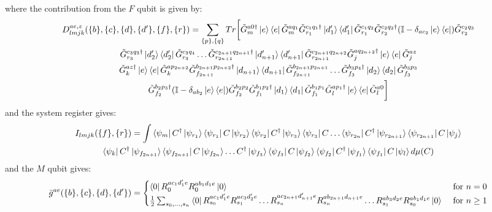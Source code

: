 \documentclass[aps,floatfix,10pt,amssymb,amsfont,amsmath,superscriptaddress,float,nofootinbib,longbibliography,nobalancelastpage,twocolumn]{revtex4-2}
\begin{document}
where the contribution from the $F$ qubit is given by:
\begin{multline}
    D^{ae,z}_{lmjk}(\{b\},\{c\},\{d\},\{d'\},\{f\},\{r\}) = 
    \sum_{\{p\},\{q\}}
Tr\bigg[\tilde G^{a0\dagger}_m\ket{e}\bra{e}\tilde G^{aq_1}_m\tilde G^{c_1q_1\dagger}_{r_1}\ket{d'_1}\bra{d'_1}\tilde G^{c_1q_2}_{r_1}\tilde G^{c_2q_2\dagger}_{r_2}(\mathbb{I} - \delta_{ac_2}\ket{e}\bra{e})\tilde G^{c_2q_3}_{r_2}\\\tilde G^{c_3q_3\dagger}_{r_3}\ket{d'_2}\bra{d'_2}\tilde G^{c_3q_4}_{r_3}\ldots
\tilde G^{c_{2n+1}q_{2n+1}\dagger}_{r_{2n+1}}\ket{d'_{n+1}}\bra{d'_{n+1}}\tilde G^{c_{2n+1}q_{2n+2}}_{r_{2n+1}}\tilde G^{aq_{2n+2}\dagger}_j\ket{e}\bra{e}\tilde G^{az}_j\\ \tilde G^{az\dagger}_k\ket{e}\bra{e}\tilde G^{ap_{2n+2}}_k\tilde G^{b_{2n+1}p_{2n+2}\dagger}_{f_{2n+1}}\ket{d_{n+1}}\bra{d_{n+1}}\tilde G^{b_{2n+1}p_{2n+1}}_{f_{2n+1}}\ldots \tilde G^{b_3p_4\dagger}_{f_3}\ket{d_2}\bra{d_2}\tilde G^{b_3p_3}_{f_3}\\\tilde G^{b_2p_3\dagger}_{f_2}(\mathbb{I} - \delta_{ab_2}\ket{e}\bra{e})\tilde G^{b_2p_2}_{f_2}\tilde G^{b_1p_2\dagger}_{f_1}\ket{d_1}\bra{d_1}\tilde G^{b_1p_1}_{f_1}\tilde G^{ap_1\dagger}_l\ket{e}\bra{e}\tilde G^{a0}_l\bigg]
\end{multline}
and the system register gives:
\begin{multline}
I_{lmjk}(\{f\},\{r\})=\int\bra{\psi_m}C^{\dagger}\ket{\psi_{r_1}}\bra{\psi_{r_1}}C\ket{\psi_{r_2}}\bra{\psi_{r_2}}C^{\dagger}\ket{\psi_{r_3}}\bra{\psi_{r_3}}C\ldots \bra{\psi_{r_{2n}}}C^{\dagger}\ket{\psi_{r_{2n+1}}}\bra{\psi_{r_{2n+1}}}C\ket{\psi_{j}}\\
\bra{\psi_{k}}C^{\dagger}\ket{\psi_{f_{2n+1}}}\bra{\psi_{f_{2n+1}}}C\ket{\psi_{f_{2n}}}\ldots C^{\dagger}\ket{\psi_{f_3}}\bra{\psi_{f_3}}C\ket{\psi_{f_2}}\bra{\psi_{f_2}}C^{\dagger}\ket{\psi_{f_1}}\bra{\psi_{f_1}}C\ket{\psi_l}d\mu(C)
\end{multline}
and the $M$ qubit gives:
\begin{equation}
       \bar g^{ae}(\{b\},\{c\},\{d\},\{d'\}) = \begin{cases} \bra{0}R_{0}^{ac_1d'_1e}R_{0}^{ab_1d_1e}\ket{0}& \text{ for } n = 0\\
       \frac12\sum_{s_0,\ldots,s_n}
       \bra{0}R_{s_0}^{ac_1d'_1e}R_{s_1}^{ac_3d'_2e}\ldots
       R_{s_n}^{ac_{2n+1}d'_{n+1}e} R_{s_n}^{ab_{2n+1}d_{n+1}e}\ldots
       R_{s_1}^{ab_3d_2e}R_{s_0}^{ab_1d_1e}\ket{0} & \text{ for } n \geq 1
       \end{cases}
       \label{eq:gbar-definition}
\end{equation}
\end{document}
